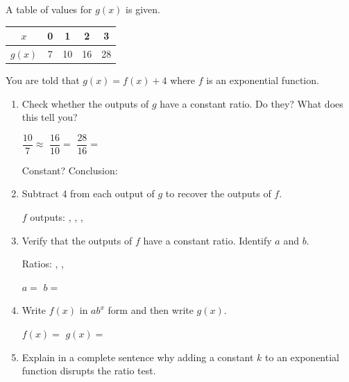 \documentclass[10pt]{article}
\begin{document}
\vspace{0.08in}

\begin{tcolorbox}[colback=white, colframe=black!40,
    title=\textbf{Tier E --- Extend},
    fonttitle=\bfseries, arc=2mm, left=3mm, right=3mm, top=2mm, bottom=2mm]

A table of values for $g(x)$ is given.

\renewcommand{\arraystretch}{1.4}
\begin{tabular}{|c|c|c|c|c|}
\hline
$x$    & 0 & 1 & 2  & 3  \\
\hline
$g(x)$ & 7 & 10 & 16 & 28 \\
\hline
\end{tabular}

You are told that $g(x) = f(x) + 4$ where $f$ is an exponential function.

\begin{enumerate}[itemsep=10pt]
  \item Check whether the outputs of $g$ have a constant ratio. Do they? What does this tell you?

        \vspace{0.06in}
        $\dfrac{10}{7} \approx $ \blank{2cm} \quad $\dfrac{16}{10} = $ \blank{2cm} \quad
        $\dfrac{28}{16} = $ \blank{2cm}

        \vspace{0.06in}
        Constant? \blank{2cm} \quad Conclusion: \writeline

  \item Subtract 4 from each output of $g$ to recover the outputs of $f$.

        \vspace{0.06in}
        $f$ outputs: \blank{1.5cm}, \blank{1.5cm}, \blank{1.5cm}, \blank{1.5cm}

  \item Verify that the outputs of $f$ have a constant ratio. Identify $a$ and $b$.

        \vspace{0.06in}
        Ratios: \blank{1.5cm}, \blank{1.5cm}, \blank{1.5cm}

        \vspace{0.04in}
        $a = $ \blank{2cm} \quad $b = $ \blank{2cm}

  \item Write $f(x)$ in $ab^x$ form and then write $g(x)$.

        \vspace{0.06in}
        $f(x) = $ \blank{5cm} \quad $g(x) = $ \blank{6cm}

  \item Explain in a complete sentence why adding a constant $k$ to an exponential function
        disrupts the ratio test.

        \vspace{0.06in}
\end{enumerate}
\end{tcolorbox}
\end{document}
